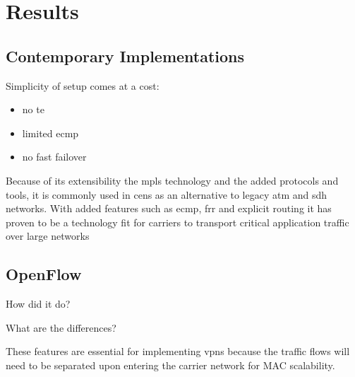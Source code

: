 \section{Results} %
\label{sec:results}

\subsection{Contemporary Implementations} %
\label{sub:contemporary_implementations}

%



Simplicity of setup comes at a cost:
\begin{itemize}
	\item no \ac{te}
	\item limited \ac{ecmp}
	\item no fast failover
\end{itemize}




Because of its extensibility the \ac{mpls} technology and the added protocols and tools, it is commonly used in \acp{cen} as an alternative to legacy \acs{atm} and \acs{sdh} networks. With added features such as \ac{ecmp}, \ac{frr} and explicit routing it has proven to be a technology fit for carriers to transport critical application traffic over large networks


\subsection{OpenFlow} %
\label{sub:openflow}

How did it do?

What are the differences?



These features are essential for implementing \acp{vpn} because the traffic flows will need to be separated upon entering the carrier network for MAC scalability.

